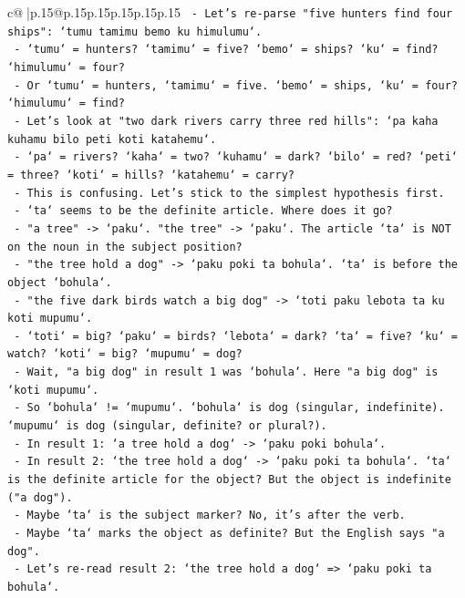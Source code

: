 \documentclass{article}
\begin{document}
{\begin{supertabular}{c@{$\;$}|p{.15\linewidth}@{}p{.15\linewidth}p{.15\linewidth}p{.15\linewidth}p{.15\linewidth}p{.15\linewidth}}
{{{\texttt{   {-} Let's re{-}parse "five hunters find four ships": `tumu tamimu bemo ku himulumu`.} \\
\texttt{     {-} `tumu` = hunters? `tamimu` = five? `bemo` = ships? `ku` = find? `himulumu` = four?} \\
\texttt{     {-} Or `tumu` = hunters, `tamimu` = five. `bemo` = ships, `ku` = four? `himulumu` = find?} \\
\texttt{     {-} Let's look at "two dark rivers carry three red hills": `pa kaha kuhamu bilo peti koti katahemu`.} \\
\texttt{       {-} `pa` = rivers? `kaha` = two? `kuhamu` = dark? `bilo` = red? `peti` = three? `koti` = hills? `katahemu` = carry?} \\
\texttt{       {-} This is confusing. Let's stick to the simplest hypothesis first.} \\
\texttt{       {-} `ta` seems to be the definite article. Where does it go?} \\
\texttt{       {-} "a tree" {-}> `paku`. "the tree" {-}> `paku`. The article `ta` is NOT on the noun in the subject position?} \\
\texttt{       {-} "the tree hold a dog" {-}> `paku poki ta bohula`. `ta` is before the object `bohula`.} \\
\texttt{       {-} "the five dark birds watch a big dog" {-}> `toti paku lebota ta ku koti mupumu`.} \\
\texttt{         {-} `toti` = big? `paku` = birds? `lebota` = dark? `ta` = five? `ku` = watch? `koti` = big? `mupumu` = dog?} \\
\texttt{         {-} Wait, "a big dog" in result 1 was `bohula`. Here "a big dog" is `koti mupumu`.} \\
\texttt{         {-} So `bohula` != `mupumu`. `bohula` is dog (singular, indefinite). `mupumu` is dog (singular, definite? or plural?).} \\
\texttt{         {-} In result 1: `a tree hold a dog` {-}> `paku poki bohula`.} \\
\texttt{         {-} In result 2: `the tree hold a dog` {-}> `paku poki ta bohula`. `ta` is the definite article for the object? But the object is indefinite ("a dog").} \\
\texttt{         {-} Maybe `ta` is the subject marker? No, it's after the verb.} \\
\texttt{         {-} Maybe `ta` marks the object as definite? But the English says "a dog".} \\
\texttt{         {-} Let's re{-}read result 2: `the tree hold a dog` => `paku poki ta bohula`.} \\
}}}
\end{supertabular}}
\end{document}
